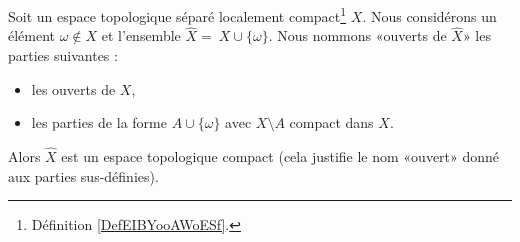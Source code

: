 \begin{propositionDef}       \label{PROPooHNOZooPSzKIN}
    Soit un espace topologique séparé localement compact\footnote{Définition \ref{DefEIBYooAWoESf}.} \( X\). Nous considérons un élément \( \omega\notin X\) et l'ensemble \( \hat X =\ X\cup\{ \omega \}\). Nous nommons «ouverts de \( \hat X\)» les parties suivantes :
    \begin{itemize}
        \item les ouverts de \( X\),
        \item les parties de la forme \( A\cup\{ \omega \}\) avec \( X\setminus A\) compact dans \( X\).
    \end{itemize}
   Alors \( \hat X\) est un espace topologique compact (cela justifie le nom «ouvert» donné aux parties sus-définies).
\end{propositionDef}

